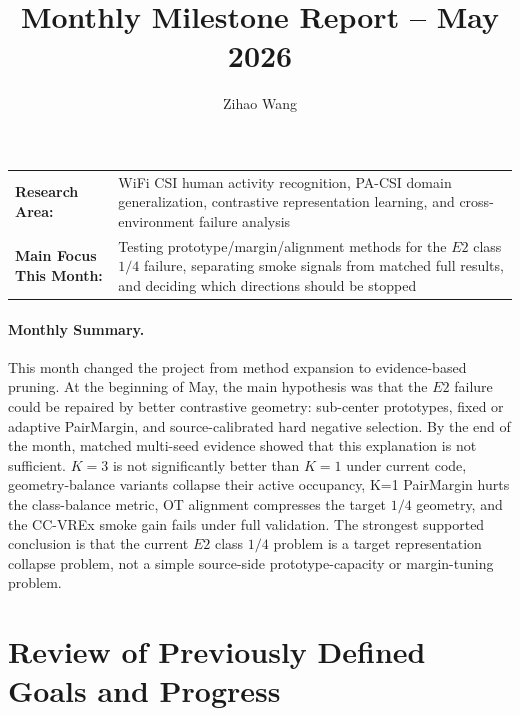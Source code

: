 \documentclass[11pt]{article}
\title{Monthly Milestone Report -- May 2026}
\author{Zihao Wang}
\date{}
\begin{document}
\maketitle

\noindent\begin{tabular}{@{}>{\bfseries}p{1.35in}p{4.75in}@{}}
Research Area: & WiFi CSI human activity recognition, PA-CSI domain generalization, contrastive representation learning, and cross-environment failure analysis \\
Main Focus This Month: & Testing prototype/margin/alignment methods for the $E2$ class $1/4$ failure, separating smoke signals from matched full results, and deciding which directions should be stopped \\
\end{tabular}

\paragraph{Monthly Summary.}
This month changed the project from method expansion to evidence-based pruning. At the beginning of May, the main hypothesis was that the $E2$ failure could be repaired by better contrastive geometry: sub-center prototypes, fixed or adaptive PairMargin, and source-calibrated hard negative selection. By the end of the month, matched multi-seed evidence showed that this explanation is not sufficient. $K=3$ is not significantly better than $K=1$ under current code, geometry-balance variants collapse their active occupancy, K=1 PairMargin hurts the class-balance metric, OT alignment compresses the target $1/4$ geometry, and the CC-VREx smoke gain fails under full validation. The strongest supported conclusion is that the current $E2$ class $1/4$ problem is a target representation collapse problem, not a simple source-side prototype-capacity or margin-tuning problem.

\clearpage

\section{Review of Previously Defined Goals and Progress}
\end{document}
